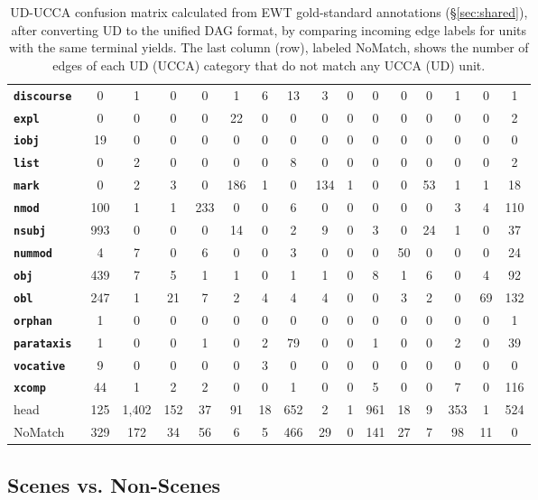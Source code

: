 \documentclass[11pt,a4paper]{article}
\begin{document}
\begin{table}[t]
\begin{tabular}{l|cccccccccccccc|c}
\bf \tt \tiny discourse & 0 & 1 & 0 & 0 & 1 & 6 & 13 & 3 & 0 & 0 & 0 & 0 & 1 & 0 & 1 \\
\bf \tt \tiny expl & 0 & 0 & 0 & 0 & 22 & 0 & 0 & 0 & 0 & 0 & 0 & 0 & 0 & 0 & 2 \\
\bf \tt \tiny iobj & 19 & 0 & 0 & 0 & 0 & 0 & 0 & 0 & 0 & 0 & 0 & 0 & 0 & 0 & 0 \\
\bf \tt \tiny list & 0 & 2 & 0 & 0 & 0 & 0 & 8 & 0 & 0 & 0 & 0 & 0 & 0 & 0 & 2 \\
\bf \tt \tiny mark & 0 & 2 & 3 & 0 & 186 & 1 & 0 & 134 & 1 & 0 & 0 & 53 & 1 & 1 & 18 \\
\bf \tt \tiny nmod & 100 & 1 & 1 & 233 & 0 & 0 & 6 & 0 & 0 & 0 & 0 & 0 & 3 & 4 & 110 \\
\bf \tt \tiny nsubj & 993 & 0 & 0 & 0 & 14 & 0 & 2 & 9 & 0 & 3 & 0 & 24 & 1 & 0 & 37 \\
\bf \tt \tiny nummod & 4 & 7 & 0 & 6 & 0 & 0 & 3 & 0 & 0 & 0 & 50 & 0 & 0 & 0 & 24 \\
\bf \tt \tiny obj & 439 & 7 & 5 & 1 & 1 & 0 & 1 & 1 & 0 & 8 & 1 & 6 & 0 & 4 & 92 \\
\bf \tt \tiny obl & 247 & 1 & 21 & 7 & 2 & 4 & 4 & 4 & 0 & 0 & 3 & 2 & 0 & 69 & 132 \\
\bf \tt \tiny orphan & 1 & 0 & 0 & 0 & 0 & 0 & 0 & 0 & 0 & 0 & 0 & 0 & 0 & 0 & 1 \\
\bf \tt \tiny parataxis & 1 & 0 & 0 & 1 & 0 & 2 & 79 & 0 & 0 & 1 & 0 & 0 & 2 & 0 & 39 \\
\bf \tt \tiny vocative & 9 & 0 & 0 & 0 & 0 & 3 & 0 & 0 & 0 & 0 & 0 & 0 & 0 & 0 & 0 \\
\bf \tt \tiny xcomp & 44 & 1 & 2 & 2 & 0 & 0 & 1 & 0 & 0 & 5 & 0 & 0 & 7 & 0 & 116 \\
\hline
head & 125 & 1,402 & 152 & 37 & 91 & 18 & 652 & 2 & 1 & 961 & 18 & 9 & 353 & 1 & 524 \\
\sc NoMatch & 329 & 172 & 34 & 56 & 6 & 5 & 466 & 29 & 0 & 141 & 27 & 7 & 98 & 11 & 0
\end{tabular}
\caption{UD-UCCA confusion matrix calculated from EWT
gold-standard annotations (\S\ref{sec:shared}),
after converting UD to the unified DAG format,
by comparing incoming edge labels for units with the same terminal yields.
The last column (row), labeled {\sc NoMatch}, shows the number of edges of each UD (UCCA) category
that do not match any UCCA (UD) unit.
\label{tab:confusion_matrix}}
\end{table}

\subsection{Scenes vs. Non-Scenes}\label{sec:s}
\end{document}
